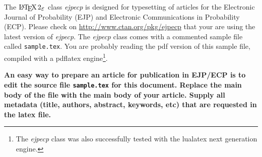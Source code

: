 \documentclass[ECP]{ejpecp} %
\begin{document}


The $\LaTeXe$ class \emph{ejpecp} is designed for typesetting of articles for
the Electronic Journal of Probability (EJP) and Electronic Communications in
Probability (ECP). Please check on \url{http://www.ctan.org/pkg/ejpecp} that
your are using the latest version of \emph{ejpecp}. The \emph{ejpecp} class
comes with a commented sample file called \texttt{sample.tex}. You are
probably reading the pdf version of this sample file, compiled with a pdflatex
engine\footnote{The \emph{ejpecp} class was also successfully tested with the lualatex next generation engine.}.

\textbf{An easy way to prepare an article for publication in EJP/ECP is to
  edit the source file \texttt{sample.tex} for this document. Replace the main
  body of the file with the main body of your article. Supply all metadata
  (title, authors, abstract, keywords, etc) that are requested in the latex
  file.}
\end{document}
